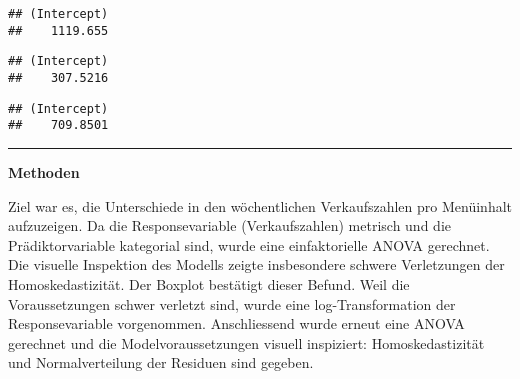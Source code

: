 \documentclass[
]{article}
\newenvironment{Shaded}{\begin{snugshade}}{\end{snugshade}}
\newcommand{\CommentTok}[1]{\textcolor[rgb]{0.56,0.35,0.01}{\textit{#1}}}
\newcommand{\DecValTok}[1]{\textcolor[rgb]{0.00,0.00,0.81}{#1}}
\newcommand{\NormalTok}[1]{#1}
\newcommand{\OperatorTok}[1]{\textcolor[rgb]{0.81,0.36,0.00}{\textbf{#1}}}
\newcommand{\StringTok}[1]{\textcolor[rgb]{0.31,0.60,0.02}{#1}}
\begin{document}
\begin{Shaded}
\end{Shaded}

\begin{verbatim}
## (Intercept) 
##    1119.655
\end{verbatim}

\begin{Shaded}
\end{Shaded}

\begin{verbatim}
## (Intercept) 
##    307.5216
\end{verbatim}

\begin{Shaded}
\end{Shaded}

\begin{verbatim}
## (Intercept) 
##    709.8501
\end{verbatim}

\begin{center}\rule{0.5\linewidth}{0.5pt}\end{center}

\textbf{Methoden}

Ziel war es, die Unterschiede in den wöchentlichen Verkaufszahlen pro
Menüinhalt aufzuzeigen. Da die Responsevariable (Verkaufszahlen)
metrisch und die Prädiktorvariable kategorial sind, wurde eine
einfaktorielle ANOVA gerechnet. Die visuelle Inspektion des Modells
zeigte insbesondere schwere Verletzungen der Homoskedastizität. Der
Boxplot bestätigt dieser Befund. Weil die Voraussetzungen schwer
verletzt sind, wurde eine log-Transformation der Responsevariable
vorgenommen. Anschliessend wurde erneut eine ANOVA gerechnet und die
Modelvoraussetzungen visuell inspiziert: Homoskedastizität und
Normalverteilung der Residuen sind gegeben.
\end{document}
